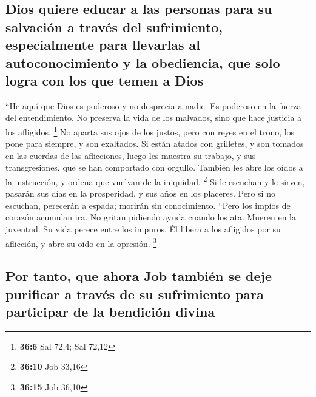\hypertarget{dios-quiere-educar-a-las-personas-para-su-salvaciuxf3n-a-travuxe9s-del-sufrimiento-especialmente-para-llevarlas-al-autoconocimiento-y-la-obediencia-que-solo-logra-con-los-que-temen-a-dios}{%
\subsection{Dios quiere educar a las personas para su salvación a través
del sufrimiento, especialmente para llevarlas al autoconocimiento y la
obediencia, que solo logra con los que temen a
Dios}\label{dios-quiere-educar-a-las-personas-para-su-salvaciuxf3n-a-travuxe9s-del-sufrimiento-especialmente-para-llevarlas-al-autoconocimiento-y-la-obediencia-que-solo-logra-con-los-que-temen-a-dios}}

 ``He aquí que Dios es poderoso y no desprecia a nadie. Es
poderoso en la fuerza del entendimiento.  No preserva la
vida de los malvados, sino que hace justicia a los afligidos.
\footnote{\textbf{36:6} Sal 72,4; Sal 72,12}  No aparta
sus ojos de los justos, pero con reyes en el trono, los pone para
siempre, y son exaltados.  Si están atados con grilletes,
y son tomados en las cuerdas de las aflicciones,  luego
les muestra su trabajo, y sus transgresiones, que se han comportado con
orgullo.  También les abre los oídos a la instrucción, y
ordena que vuelvan de la iniquidad. \footnote{\textbf{36:10} Job 33,16}
 Si le escuchan y le sirven, pasarán sus días en la
prosperidad, y sus años en los placeres.  Pero si no
escuchan, perecerán a espada; morirán sin conocimiento. 
``Pero los impíos de corazón acumulan ira. No gritan pidiendo ayuda
cuando los ata.  Mueren en la juventud. Su vida perece
entre los impuros.  Él libera a los afligidos por su
aflicción, y abre su oído en la opresión. \footnote{\textbf{36:15} Job
  36,10}

\hypertarget{por-tanto-que-ahora-job-tambiuxe9n-se-deje-purificar-a-travuxe9s-de-su-sufrimiento-para-participar-de-la-bendiciuxf3n-divina}{%
\subsection{Por tanto, que ahora Job también se deje purificar a través
de su sufrimiento para participar de la bendición
divina}\label{por-tanto-que-ahora-job-tambiuxe9n-se-deje-purificar-a-travuxe9s-de-su-sufrimiento-para-participar-de-la-bendiciuxf3n-divina}}

